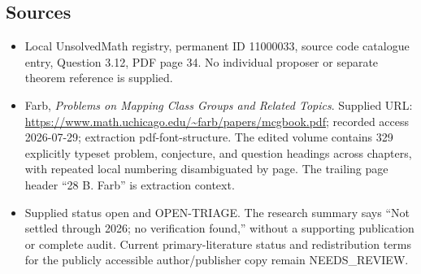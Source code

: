 \documentclass[11pt]{article}
\begin{document}
\subsection{Sources}
\begin{itemize}
\item Local UnsolvedMath registry, permanent ID 11000033, source code catalogue entry, Question 3.12, PDF page 34. No individual proposer or separate theorem reference is supplied.
\item Farb, \emph{Problems on Mapping Class Groups and Related Topics}. Supplied URL: \url{https://www.math.uchicago.edu/~farb/papers/mcgbook.pdf}; recorded access 2026-07-29; extraction pdf-font-structure. The edited volume contains 329 explicitly typeset problem, conjecture, and question headings across chapters, with repeated local numbering disambiguated by page. The trailing page header ``28 B. Farb'' is extraction context.
\item Supplied status open and OPEN-TRIAGE. The research summary says ``Not settled through 2026; no verification found,'' without a supporting publication or complete audit. Current primary-literature status and redistribution terms for the publicly accessible author/publisher copy remain NEEDS\_REVIEW.
\end{itemize}
\end{document}
